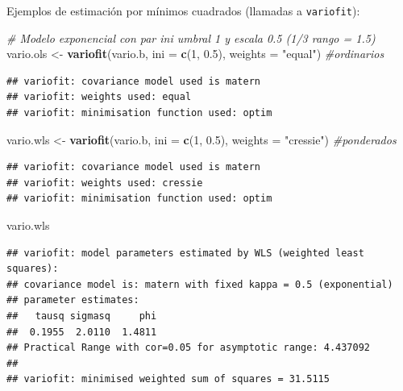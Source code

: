 \documentclass[
]{book}
\newenvironment{Shaded}{\begin{snugshade}}{\end{snugshade}}
\newcommand{\AttributeTok}[1]{\textcolor[rgb]{0.13,0.29,0.53}{#1}}
\newcommand{\CommentTok}[1]{\textcolor[rgb]{0.56,0.35,0.01}{\textit{#1}}}
\newcommand{\DecValTok}[1]{\textcolor[rgb]{0.00,0.00,0.81}{#1}}
\newcommand{\FloatTok}[1]{\textcolor[rgb]{0.00,0.00,0.81}{#1}}
\newcommand{\FunctionTok}[1]{\textcolor[rgb]{0.13,0.29,0.53}{\textbf{#1}}}
\newcommand{\NormalTok}[1]{#1}
\newcommand{\OtherTok}[1]{\textcolor[rgb]{0.56,0.35,0.01}{#1}}
\newcommand{\StringTok}[1]{\textcolor[rgb]{0.31,0.60,0.02}{#1}}
\theoremstyle{break}
\theoremstyle{definition}
\theoremstyle{definition}
\theoremstyle{definition}
\theoremstyle{definition}
\theoremstyle{remark}
\begin{document}
Ejemplos de estimación por mínimos cuadrados (llamadas a \texttt{variofit}):

\begin{Shaded}
\begin{Highlighting}[]
\CommentTok{\#   Modelo exponencial con par ini umbral 1 y escala 0.5 (1/3 rango = 1.5)}
\NormalTok{vario.ols }\OtherTok{\textless{}{-}} \FunctionTok{variofit}\NormalTok{(vario.b, }\AttributeTok{ini =} \FunctionTok{c}\NormalTok{(}\DecValTok{1}\NormalTok{, }\FloatTok{0.5}\NormalTok{), }\AttributeTok{weights =} \StringTok{"equal"}\NormalTok{)  }\CommentTok{\#ordinarios}
\end{Highlighting}
\end{Shaded}

\begin{verbatim}
## variofit: covariance model used is matern 
## variofit: weights used: equal 
## variofit: minimisation function used: optim
\end{verbatim}

\begin{Shaded}
\begin{Highlighting}[]
\NormalTok{vario.wls }\OtherTok{\textless{}{-}} \FunctionTok{variofit}\NormalTok{(vario.b, }\AttributeTok{ini =} \FunctionTok{c}\NormalTok{(}\DecValTok{1}\NormalTok{, }\FloatTok{0.5}\NormalTok{), }\AttributeTok{weights =} \StringTok{"cressie"}\NormalTok{)  }\CommentTok{\#ponderados}
\end{Highlighting}
\end{Shaded}

\begin{verbatim}
## variofit: covariance model used is matern 
## variofit: weights used: cressie 
## variofit: minimisation function used: optim
\end{verbatim}

\begin{Shaded}
\begin{Highlighting}[]
\NormalTok{vario.wls}
\end{Highlighting}
\end{Shaded}

\begin{verbatim}
## variofit: model parameters estimated by WLS (weighted least squares):
## covariance model is: matern with fixed kappa = 0.5 (exponential)
## parameter estimates:
##   tausq sigmasq     phi 
##  0.1955  2.0110  1.4811 
## Practical Range with cor=0.05 for asymptotic range: 4.437092
## 
## variofit: minimised weighted sum of squares = 31.5115
\end{verbatim}
\end{document}
